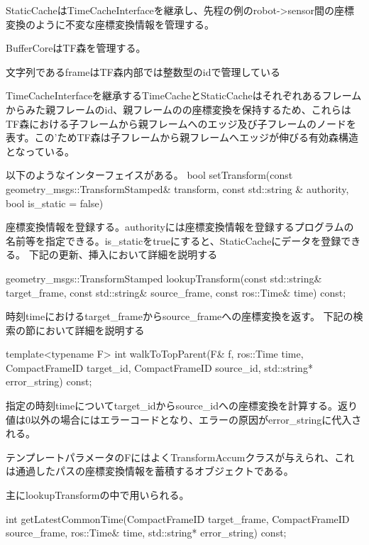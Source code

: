 \documentclass{article}
\begin{document}
\begin{multicols}{2}




StaticCacheはTimeCacheInterfaceを継承し、先程の例のrobot->sensor間の座標変換のように不変な座標変換情報を管理する。


BufferCoreはTF森を管理する。

文字列であるframeはTF森内部では整数型のidで管理している

TimeCacheInterfaceを継承するTimeCacheとStaticCacheはそれぞれあるフレームからみた親フレームのid、親フレームのの座標変換を保持するため、これらはTF森における子フレームから親フレームへのエッジ及び子フレームのノードを表す。この’ためTF森は子フレームから親フレームへエッジが伸びる有効森構造となっている。


以下のようなインターフェイスがある。
bool setTransform(const geometry\_msgs::TransformStamped\& transform, const std::string \& authority, bool is\_static = false)

座標変換情報を登録する。authorityには座標変換情報を登録するプログラムの名前等を指定できる。is\_staticをtrueにすると、StaticCacheにデータを登録できる。
下記の更新、挿入において詳細を説明する

geometry\_msgs::TransformStamped lookupTransform(const std::string\& target\_frame, const std::string\& source\_frame, const ros::Time\& time) const;
		   
時刻timeにおけるtarget\_frameからsource\_frameへの座標変換を返す。
下記の検索の節において詳細を説明する


template<typename F> int walkToTopParent(F\& f, ros::Time time, CompactFrameID target\_id, CompactFrameID source\_id, std::string* error\_string) const;


指定の時刻timeについてtarget\_idからsource\_idへの座標変換を計算する。返り値は0以外の場合にはエラーコードとなり、エラーの原因がerror\_stringに代入される。

テンプレートパラメータのFにはよくTransformAccumクラスが与えられ、これは通過したパスの座標変換情報を蓄積するオブジェクトである。

主にlookupTransformの中で用いられる。

int getLatestCommonTime(CompactFrameID target\_frame, CompactFrameID source\_frame, ros::Time\& time, std::string* error\_string) const;


\end{multicols}
\end{document}
